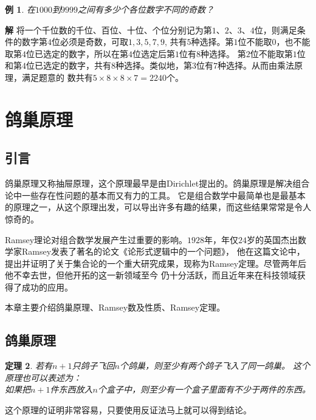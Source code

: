 \documentclass[a4paper,11pt,twoside]{book}
\newtheorem{thm}{定理}[section]
\newtheorem{exa}[thm]{例}
\begin{document}
\begin{exa}
在$1000$到$9999$之间有多少个各位数字不同的奇数？
\end{exa}
\textbf{解}
将一个千位数的千位、百位、十位、个位分别记为第$1$、$2$、$3$、$4$位，则满足条件的数字第$4$位必须是奇数，可取$1,3,5,7,9$,
共有$5$种选择。第$1$位不能取$0$，也不能取第$4$位已选定的数字，所以在第$4$位选定后第$1$位有$8$种选择。
第$2$位不能取第$1$位和第$4$位已选定的数字，共有$8$种选择。类似地，第$3$位有$7$种选择。从而由乘法原理，满足题意的
数共有$5\times 8\times 8\times 7=2240$个。

\section{鸽巢原理}
\subsection{引言}

鸽巢原理又称抽屉原理，这个原理最早是由Dirichlet提出的。鸽巢原理是解决组合论中一些存在性问题的基本而又有力的工具。
它是组合数学中最简单也是最基本的原理之一，从这个原理出发，可以导出许多有趣的结果，而这些结果常常是令人惊奇的。

Ramsey理论对组合数学发展产生过重要的影响。$1928$年，年仅$24$岁的英国杰出数学家Ramsey发表了著名的论文《论形式逻辑中的一个问题》，
他在这篇文论中，提出并证明了关于集合论的一个重大研究成果，现称为Ramsey定理。尽管两年后他不幸去世，但他开拓的这一新领域至今
仍十分活跃，而且近年来在科技领域获得了成功的应用。

本章主要介绍鸽巢原理、Ramsey数及性质、Ramsey定理。
\subsection{鸽巢原理}
\begin{thm}
若有$n+1$只鸽子飞回$n$个鸽巢，则至少有两个鸽子飞入了同一鸽巢。
这个原理也可以表述为：\\如果把$n+1$件东西放入$n$个盒子中，则至少有一个盒子里面有不少于两件的东西。
\end{thm}
这个原理的证明非常容易，只要使用反证法马上就可以得到结论。
\end{document}
